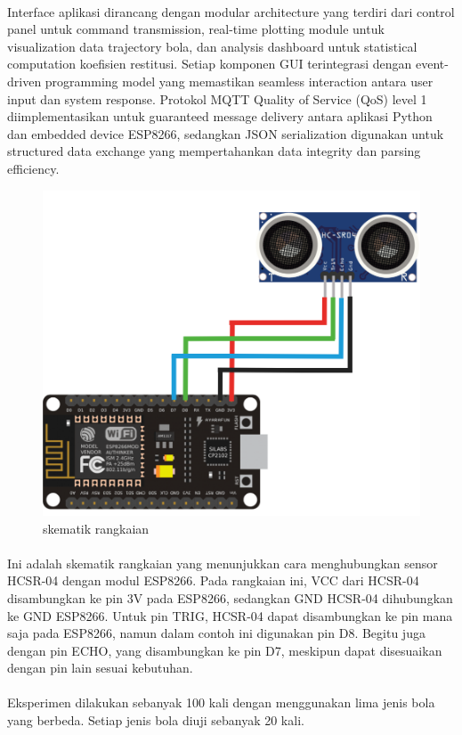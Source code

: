 \paragraph{}Interface aplikasi dirancang dengan modular architecture yang terdiri dari control panel untuk command transmission, real-time plotting module untuk visualization data trajectory bola, dan analysis dashboard untuk statistical computation koefisien restitusi. Setiap komponen GUI terintegrasi dengan event-driven programming model yang memastikan seamless interaction antara user input dan system response. Protokol MQTT Quality of Service (QoS) level 1 diimplementasikan untuk guaranteed message delivery antara aplikasi Python dan embedded device ESP8266, sedangkan JSON serialization digunakan untuk structured data exchange yang mempertahankan data integrity dan parsing efficiency.
\begin{figure}
    \centering
    \includegraphics[width=0.5\linewidth]{images/Skematik Rangkaian.png}
    \caption{skematik rangkaian}
    \label{fig:skematik_rangkaian}
\end{figure}
\paragraph{}Ini adalah skematik rangkaian yang menunjukkan cara menghubungkan sensor HCSR-04 dengan modul ESP8266. Pada rangkaian ini, VCC dari HCSR-04 disambungkan ke pin 3V pada ESP8266, sedangkan GND HCSR-04 dihubungkan ke GND ESP8266. Untuk pin TRIG, HCSR-04 dapat disambungkan ke pin mana saja pada ESP8266, namun dalam contoh ini digunakan pin D8. Begitu juga dengan pin ECHO, yang disambungkan ke pin D7, meskipun dapat disesuaikan dengan pin lain sesuai kebutuhan.
\paragraph{}Eksperimen dilakukan sebanyak 100 kali dengan menggunakan lima jenis bola yang berbeda. Setiap jenis bola diuji sebanyak 20 kali.

